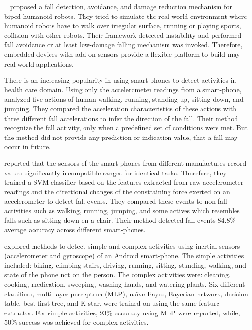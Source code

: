 \documentclass{IEEEtran}
\begin{document}
{~\cite{moyaFallAndDamageDetection2015}} proposed a fall detection, avoidance, and damage 
reduction mechanism for biped humanoid robots. They tried to simulate the real world environment 
where humanoid robots have to walk over irregular surface, running or playing sports, collision 
with other robots. Their framework detected instability and performed fall avoidance or at 
least low-damage falling mechanism was invoked. Therefore, embedded devices  with add-on sensors 
provide a flexible platform to build may real world applications. 


There is an increasing popularity in using smart-phones to detect activities in health care domain. 
Using only the accelerometer readings from a smart-phone, \cite{baiFallDetectionPhone2013} analyzed five 
actions of human walking, running, standing up, sitting down, and jumping. They compared the 
acceleration characteristics of these actions with three different fall accelerations to infer the 
direction of the fall. Their method recognize the fall activity, only when a predefined set of 
conditions were met. But the method did not provide any prediction or indication value, that a fall 
may occur in future. 

\cite{steidlFallDetection2012} reported that the sensors of the smart-phones from different manufactures 
record values significantly incompatible ranges for identical tasks. Therefore, they trained a SVM 
classifier based on the features extracted from raw accelerometer readings and the directional 
changes of the constraining force exerted on an accelerometer to detect fall events. They compared 
these events to non-fall activities such as walking, running, jumping, and some actives which 
resembles falls such as sitting down on a chair. Their method detected fall events 84.8\% average 
accuracy across different smart-phones. 

\cite{DernbachActivityAndFallDetectionPhone2012} explored methods to detect simple and complex activities using inertial 
sensors (accelerometer and gyroscope) of an Android smart-phone. The simple activities included: 
biking, climbing stairs, driving, running, sitting, standing, walking, and state of the phone not 
on the person. The complex activities were: cleaning, cooking, medication, sweeping, washing hands, 
and watering plants. Six different classifiers, multi-layer  perceptron (MLP), na\"{i}ve  Bayes,  
Bayesian  network,  decision  table,  best-first tree, and  K-star,  were trained on using the same 
feature extractor. For simple activities, 93\% accuracy using MLP were reported, while, 50\% 
success was achieved for complex activities.    
\end{document}
